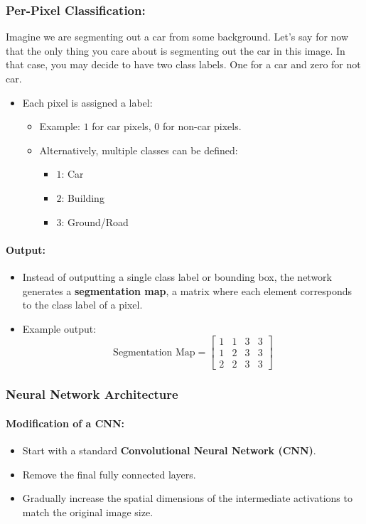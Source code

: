 \documentclass[letterpaper,12pt,notitlepage,twoside]{report}
\begin{document}
\subsubsection*{Per-Pixel Classification:}
Imagine we are segmenting out a car from some background. Let's say for now that the only thing you care about is segmenting out the car in this image. In that case, you may decide to have two class labels. One for a car and zero for not car. 

\begin{itemize}
    \item Each pixel is assigned a label:
    \begin{itemize}
        \item Example: $1$ for car pixels, $0$ for non-car pixels.
        \item Alternatively, multiple classes can be defined:
        \begin{itemize}
            \item $1$: Car
            \item $2$: Building
            \item $3$: Ground/Road
        \end{itemize}
    \end{itemize}
\end{itemize}

\paragraph{Output:}
\begin{itemize}
    \item Instead of outputting a single class label or bounding box, the network generates a \textbf{segmentation map}, a matrix where each element corresponds to the class label of a pixel.
    \item Example output:
    \[
    \text{Segmentation Map} =
    \begin{bmatrix}
        1 & 1 & 3 & 3 \\
        1 & 2 & 3 & 3 \\
        2 & 2 & 3 & 3
    \end{bmatrix}
    \]
\end{itemize}

\subsubsection*{Neural Network Architecture}

\paragraph{Modification of a CNN:}
\begin{itemize}
    \item Start with a standard \textbf{Convolutional Neural Network (CNN)}.
    \item Remove the final fully connected layers.
    \item Gradually increase the spatial dimensions of the intermediate activations to match the original image size.
\end{itemize}
\end{document}
